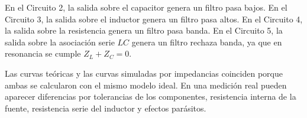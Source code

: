 En el Circuito 2, la salida sobre el capacitor genera un filtro pasa bajos. En el Circuito 3, la salida sobre el inductor genera un filtro pasa altos. En el Circuito 4, la salida sobre la resistencia genera un filtro pasa banda. En el Circuito 5, la salida sobre la asociación serie $LC$ genera un filtro rechaza banda, ya que en resonancia se cumple $Z_L+Z_C=0$.

Las curvas teóricas y las curvas simuladas por impedancias coinciden porque ambas se calcularon con el mismo modelo ideal. En una medición real pueden aparecer diferencias por tolerancias de los componentes, resistencia interna de la fuente, resistencia serie del inductor y efectos parásitos.
